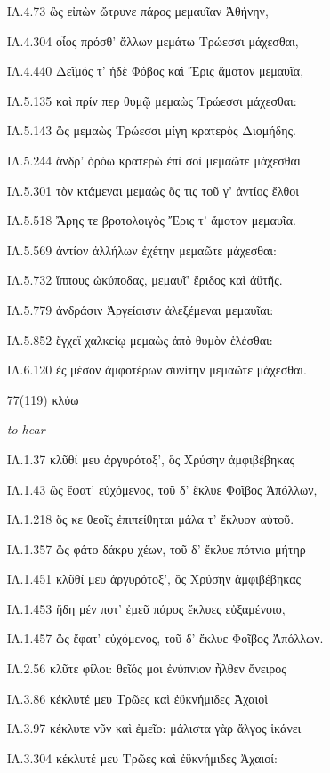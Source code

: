 \begin{enumerate}
{ΙΛ.4.73 ὣς εἰπὼν ὤτρυνε πάρος μεμαυῖαν Ἀθήνην, 

ΙΛ.4.304 οἶος πρόσθ' ἄλλων μεμάτω Τρώεσσι μάχεσθαι, 

ΙΛ.4.440 Δεῖμός τ' ἠδὲ Φόβος καὶ Ἔρις ἄμοτον μεμαυῖα, 

ΙΛ.5.135 καὶ πρίν περ θυμῷ μεμαὼς Τρώεσσι μάχεσθαι: 

ΙΛ.5.143 ὣς μεμαὼς Τρώεσσι μίγη κρατερὸς Διομήδης. 

ΙΛ.5.244 ἄνδρ' ὁρόω κρατερὼ ἐπὶ σοὶ μεμαῶτε μάχεσθαι 

ΙΛ.5.301 τὸν κτάμεναι μεμαὼς ὅς τις τοῦ γ' ἀντίος ἔλθοι 

ΙΛ.5.518 Ἄρης τε βροτολοιγὸς Ἔρις τ' ἄμοτον μεμαυῖα. 

ΙΛ.5.569 ἀντίον ἀλλήλων ἐχέτην μεμαῶτε μάχεσθαι: 

ΙΛ.5.732 ἵππους ὠκύποδας, μεμαυῖ' ἔριδος καὶ ἀϋτῆς. 

ΙΛ.5.779 ἀνδράσιν Ἀργείοισιν ἀλεξέμεναι μεμαυῖαι: 

ΙΛ.5.852 ἔγχεϊ χαλκείῳ μεμαὼς ἀπὸ θυμὸν ἑλέσθαι: 

ΙΛ.6.120 ἐς μέσον ἀμφοτέρων συνίτην μεμαῶτε μάχεσθαι. 

}

\clearpage
\item[\large 77(119)]{\large \g κλύω	}

\hspace{0.2cm} \textit{ to hear }

{\g
ΙΛ.1.37 κλῦθί μευ ἀργυρότοξ', ὃς Χρύσην ἀμφιβέβηκας 

ΙΛ.1.43 ὣς ἔφατ' εὐχόμενος, τοῦ δ' ἔκλυε Φοῖβος Ἀπόλλων, 

ΙΛ.1.218 ὅς κε θεοῖς ἐπιπείθηται μάλα τ' ἔκλυον αὐτοῦ. 

ΙΛ.1.357 ὣς φάτο δάκρυ χέων, τοῦ δ' ἔκλυε πότνια μήτηρ 

ΙΛ.1.451 κλῦθί μευ ἀργυρότοξ', ὃς Χρύσην ἀμφιβέβηκας 

ΙΛ.1.453 ἤδη μέν ποτ' ἐμεῦ πάρος ἔκλυες εὐξαμένοιο, 

ΙΛ.1.457 ὣς ἔφατ' εὐχόμενος, τοῦ δ' ἔκλυε Φοῖβος Ἀπόλλων. 

ΙΛ.2.56 κλῦτε φίλοι: θεῖός μοι ἐνύπνιον ἦλθεν ὄνειρος 

ΙΛ.3.86 κέκλυτέ μευ Τρῶες καὶ ἐϋκνήμιδες Ἀχαιοὶ 

ΙΛ.3.97 κέκλυτε νῦν καὶ ἐμεῖο: μάλιστα γὰρ ἄλγος ἱκάνει 

ΙΛ.3.304 κέκλυτέ μευ Τρῶες καὶ ἐϋκνήμιδες Ἀχαιοί: 

}
\end{enumerate}
